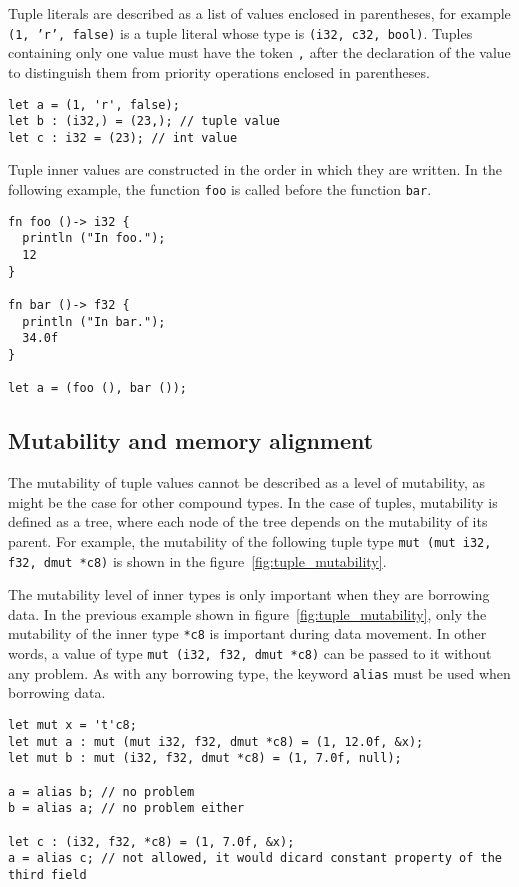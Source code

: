 Tuple literals are described as a list of values enclosed in parentheses, for
example \texttt{(1, 'r', false)} is a tuple literal whose type is \texttt{(i32,
  c32, bool)}. Tuples containing only one value must have the token \texttt{,}
after the declaration of the value to distinguish them from priority operations
enclosed in parentheses.

\begin{lstlisting}[style=coloredverbatim]
let a = (1, 'r', false);
let b : (i32,) = (23,); // tuple value
let c : i32 = (23); // int value
\end{lstlisting}

\noindent Tuple inner values are constructed in the order in which they are
written. In the following example, the function \texttt{foo} is called before
the function \texttt{bar}.

\begin{lstlisting}[style=coloredverbatim]
fn foo ()-> i32 {
  println ("In foo.");
  12
}

fn bar ()-> f32 {
  println ("In bar.");
  34.0f
}

let a = (foo (), bar ());
\end{lstlisting}

\subsection {Mutability and memory alignment}%
\label{sec:tuple_mutability}

The mutability of tuple values cannot be described as a level of mutability, as
might be the case for other compound types. In the case of tuples, mutability is
defined as a tree, where each node of the tree depends on the mutability of its
parent. For example, the mutability of the following tuple type \texttt{mut (mut
  i32, f32, dmut *c8)} is shown in the figure~\ref{fig:tuple_mutability}.



The mutability level of inner types is only important when they are borrowing
data. In the previous example shown in figure~\ref{fig:tuple_mutability}, only
the mutability of the inner type \texttt{*c8} is important during data movement.
In other words, a value of type \texttt{mut (i32, f32, dmut *c8)} can be passed
to it without any problem. As with any borrowing type, the keyword
\texttt{alias} must be used when borrowing data.

\begin{lstlisting}[style=coloredverbatim]
let mut x = 't'c8;
let mut a : mut (mut i32, f32, dmut *c8) = (1, 12.0f, &x);
let mut b : mut (i32, f32, dmut *c8) = (1, 7.0f, null);

a = alias b; // no problem
b = alias a; // no problem either

let c : (i32, f32, *c8) = (1, 7.0f, &x);
a = alias c; // not allowed, it would dicard constant property of the third field
\end{lstlisting}

